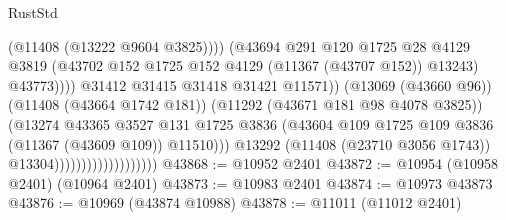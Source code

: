 \begin{lexlean}{RustStd}
\begin{coremodule}
                                                          (@11408 (@13222 @9604 @3825))))
                                                      (@43694
                                                        @291
                                                        @120
                                                        @1725
                                                        @28
                                                        @4129
                                                        @3819
                                                        (@43702
                                                          @152
                                                          @1725
                                                          @152
                                                          @4129
                                                          (@11367 (@43707 @152))
                                                          @13243)
                                                        @43773))))
                                                @31412
                                                @31415
                                                @31418
                                                @31421
                                                @11571))
                                            (@13069 (@43660 @96))
                                            (@11408 (@43664 @1742 @181))
                                            (@11292 (@43671 @181 @98 @4078 @3825))
                                            (@13274
                                              @43365
                                              @3527
                                              @131
                                              @1725
                                              @3836
                                              (@43604
                                                @109
                                                @1725
                                                @109
                                                @3836
                                                (@11367 (@43609 @109))
                                                @11510)))
                                          @13292
                                          (@11408 (@23710 @3056 @1743))
                                          @13304)))))))))))))))))))
@43868 := @10952 @2401
@43872 := @10954 (@10958 @2401) (@10964 @2401)
@43873 := @10983 @2401
@43874 := @10973 @43873
@43876 := @10969 (@43874 @10988)
@43878 := @11011 (@11012 @2401)

\end{coremodule}
\end{lexlean}
